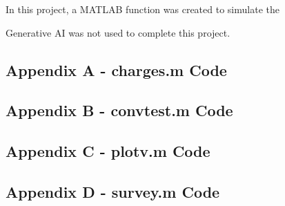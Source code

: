 \documentclass[10pt]{article}
\begin{document}
In this project, a MATLAB function was created to simulate the 




Generative AI was not used to complete this project. 

\pagebreak

\subsection*{Appendix A - charges.m Code}


\pagebreak

\subsection*{Appendix B - convtest.m Code}


\pagebreak

\subsection*{Appendix C - plotv.m Code}


\pagebreak

\subsection*{Appendix D - survey.m Code}


\pagebreak
\end{document}
